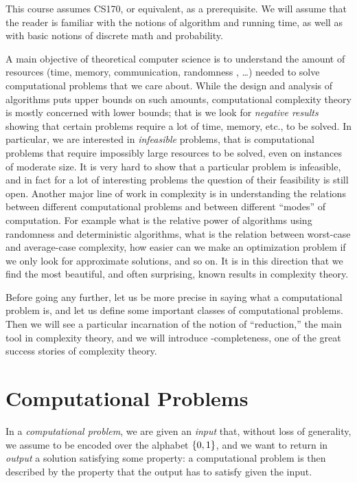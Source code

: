 





This course assumes CS170, or equivalent, as a prerequisite.
We will assume that the reader is familiar with the notions
of algorithm and running time, as well as with basic notions
of discrete math and probability.

A main objective of theoretical computer science is
to understand the amount of resources (time, memory,
communication, randomness , \ldots) needed to solve
computational problems that we care about. While the
design and analysis of algorithms puts upper bounds
on such amounts, computational complexity theory is
mostly concerned with lower bounds; that is we look
for {\em negative results} showing that certain problems
require a lot of time, memory, etc., to be solved.
In particular, we are interested in {\em infeasible}
problems, that is computational problems that require
impossibly large resources to be solved, even on instances
of moderate size. It is very hard to show that a particular
problem is infeasible, and in fact for a lot 
of interesting problems the question of their feasibility
is still open. Another major line of work in complexity
is in understanding the relations between different computational problems
and between different ``modes'' of computation. For
example what is the relative power of algorithms using
randomness and deterministic algorithms, what is the
relation between worst-case and average-case complexity,
how easier can we make an optimization problem if we only
look for approximate solutions, and so on. It is in this
direction that we find the most beautiful, and often
surprising, known results in complexity theory.

Before going any further, let us be more precise in
saying what a computational problem is, and let us
define some important classes of computational problems.
Then we will see a particular incarnation of the notion
of ``reduction,'' the main tool in complexity theory,
and we will introduce \np-completeness, one of the great
success stories of complexity theory.

\section*{Computational Problems}

In a {\em computational problem}, we are given an {\em input}
that, without loss of generality, we assume to be encoded
over the alphabet $\{0,1\}$, and we want to return in {\em output}
a solution satisfying some property: a computational problem
is then described by the property that the output has to satisfy
given the input.

